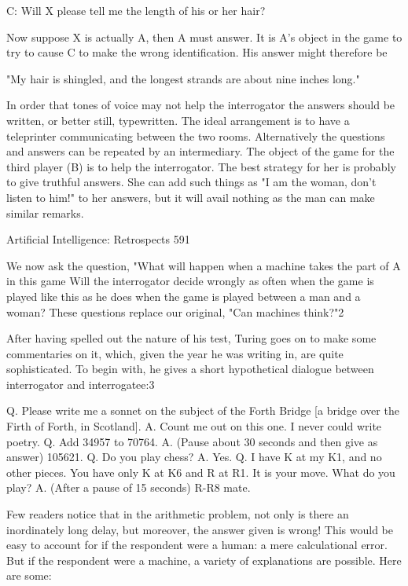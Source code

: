 {   C: Will X please tell me the length of his or her hair?

   Now suppose X is actually A, then A must answer. It is A's object in the game to
   try to cause C to make the wrong identification. His answer might therefore be

   "My hair is shingled, and the longest strands are about nine inches long."

   In order that tones of voice may not help the interrogator the answers should be
   written, or better still, typewritten. The ideal arrangement is to have a teleprinter
   communicating between the two rooms. Alternatively the questions and answers
   can be repeated by an intermediary. The object of the game for the third player (B)
   is to help the interrogator. The best strategy for her is probably to give truthful
   answers. She can add such things as "I am the woman, don't listen to him!" to her
   answers, but it will avail nothing as the man can make similar remarks.

Artificial Intelligence: Retrospects                                                   591

   We now ask the question, "What will happen when a machine takes the part of A
   in this game Will the interrogator decide wrongly as often when the game is
   played like this as he does when the game is played between a man and a woman?
   These questions replace our original, "Can machines think?"2

After having spelled out the nature of his test, Turing goes on to make some
commentaries on it, which, given the year he was writing in, are quite sophisticated. To
begin with, he gives a short hypothetical dialogue between interrogator and interrogatee:3

       Q. Please write me a sonnet on the subject of the Forth Bridge [a bridge over the
       Firth of Forth, in Scotland].
       A. Count me out on this one. I never could write poetry.
       Q. Add 34957 to 70764.
       A. (Pause about 30 seconds and then give as answer) 105621.
       Q. Do you play chess?
       A. Yes.
       Q. I have K at my K1, and no other pieces. You have only K at K6 and R at R1. It
       is your move. What do you play?
       A. (After a pause of 15 seconds) R-R8 mate.

Few readers notice that in the arithmetic problem, not only is there an inordinately long
delay, but moreover, the answer given is wrong! This would be easy to account for if the
respondent were a human: a mere calculational error. But if the respondent were a
machine, a variety of explanations are possible. Here are some:

}
